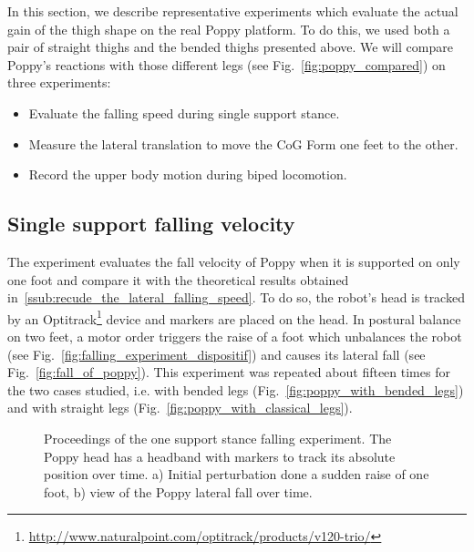 In this section, we describe representative experiments which evaluate the actual gain of the thigh
shape on the real Poppy platform.
To do this, we used both a pair of straight thighs and the bended
thighs presented above.
We will compare Poppy's reactions with those different legs (see
Fig.~\ref{fig:poppy_compared}) on three experiments:
\begin{itemize}
    \item Evaluate the falling speed during single support stance.
    \item Measure the lateral translation to move the CoG Form one feet to the other.
    \item Record the upper body motion during biped locomotion.
\end{itemize}

\subsection{Single support falling velocity} %
\label{sub:falling_velocity}
The experiment evaluates the fall velocity of Poppy when it is supported on only one foot and compare it with the theoretical results obtained in~\ref{ssub:recude_the_lateral_falling_speed}.
To do so, the robot's head is tracked by an Optitrack\footnote{\url{http://www.naturalpoint.com/optitrack/products/v120-trio/}} device and markers are placed on the head.
In postural balance on two feet, a motor order triggers the raise of a foot which unbalances the robot (see Fig.~\ref{fig:falling_experiment_dispositif}) and causes its lateral fall (see Fig.~\ref{fig:fall_of_poppy}).
This experiment was repeated about fifteen times for the two cases studied, i.e.
with bended legs (Fig.~\ref{fig:poppy_with_bended_legs}) and with straight legs (Fig.~\ref{fig:poppy_with_classical_legs}).

\begin{figure}[h]
\centering
    \hfil
    \caption{Proceedings of the one support stance falling experiment.
    The Poppy head has a headband with markers to track its absolute position over time.
     a) Initial perturbation done a sudden raise of one foot, b) view of the Poppy lateral fall over time.}
    \label{fig:falling_experiment}
\end{figure}


